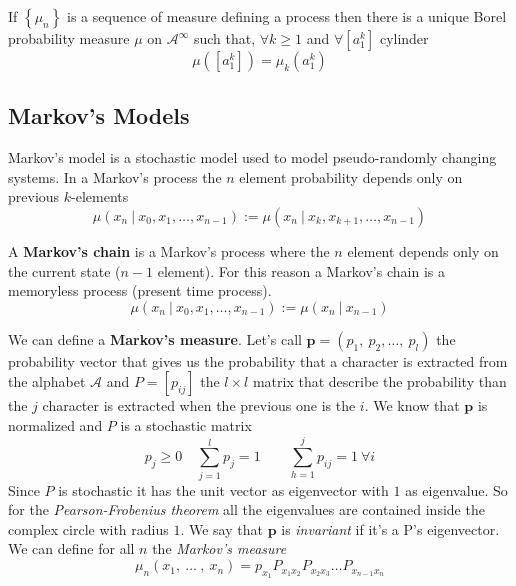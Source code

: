 \begin{theorem}
    If $\left\{\mu_n\right\}$ is a sequence of measure defining a process then there is a unique Borel probability measure $\mu$ on $\mathcal{A}^\infty$ such that, $\forall k \geq 1$ and $\forall \left[a_1^k\right]$ cylinder
    \begin{equation*}
        \mu\left(\left[a_1^k\right]\right) = \mu_k\left(a_1^k\right)
    \end{equation*}
\end{theorem}

\subsection{Markov's Models}
Markov's model is a stochastic model used to model pseudo-randomly changing systems.
In a Markov's process the $n$ element probability depends only on previous $k$-elements
\begin{equation*}
\mu\left(x_{n}\ \vert\ x_{0}, x_{1}, \dots, x_{n-1}\right):=\mu\left(x_{n}\ \vert\ x_{k}, x_{k+1}, \dots, x_{n-1}\right)
\end{equation*}

A \textbf{Markov's chain} is a Markov's process where the $n$ element depends only on the current state ($n-1$ element).
For this reason a Markov's chain is a memoryless process (present time process).
\begin{equation*}
\mu\left(x_{n}\ \vert\ x_{0}, x_{1}, \dots, x_{n-1}\right):=\mu\left(x_{n}\ \vert\ x_{n-1}\right)
\end{equation*}

We can define a \textbf{Markov's measure}.
Let's call $\mathbf{p}=\left(p_{1},\ p_{2},\dots ,\ p_{l}\right)$ the probability vector that gives us the probability that a character is extracted from the alphabet $\mathcal{A}$ and $P=\left[p_{ij}\right]$ the $l\times l$ matrix that describe the probability than the $j$ character is extracted when the previous one is the $i$.
We know that $\mathbf{p}$ is normalized and $P$ is a stochastic matrix
\[p_{j}\geq 0\quad \sum_{j=1}^{l}p_{j}=1\qquad\sum_{h=1}^{j}p_{ij}=1\ \forall i\]
Since $P$ is stochastic it has the unit vector as eigenvector with $1$ as eigenvalue.
So for the \emph{Pearson-Frobenius theorem} all the eigenvalues are contained inside the complex circle with radius $1$.
We say that $\mathbf{p}$ is \emph{invariant} if it's a P's eigenvector. We can define for all $n$ the \emph{Markov's measure}
\begin{equation*}
    \mu_{n}\left(x_{1},\ \dots\ ,\ x_{n}\right)=p_{x_{1}}P_{x_{1}x_{2}}P_{x_{2}x_{3}}\ldots P_{x_{n-1}x_{n}}
\end{equation*}


